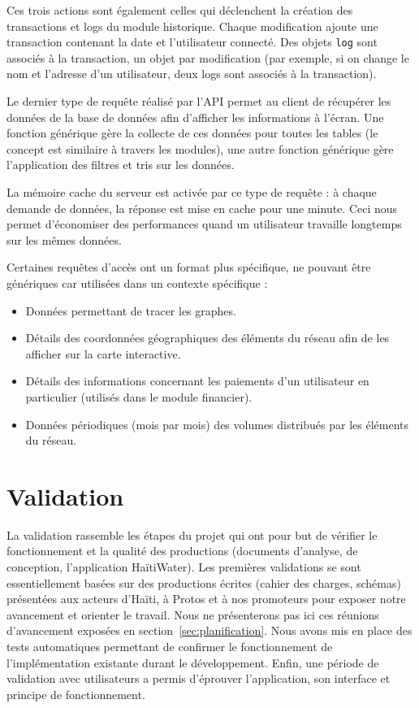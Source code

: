 \documentclass{EPL-master-thesis-covers-FR}
\begin{document}
				Ces trois actions sont également celles qui déclenchent la création des transactions et logs du module historique. Chaque modification ajoute une transaction contenant la date et l'utilisateur connecté. Des objets \texttt{log} sont associés à la transaction, un objet par modification (par exemple, si on change le nom et l'adresse d'un utilisateur, deux logs sont associés à la transaction).

				Le dernier type de requête réalisé par l'API permet au client de récupérer les données de la base de données afin d'afficher les informations à l'écran. Une fonction générique gère la collecte de ces données pour toutes les tables (le concept est similaire à travers les modules), une autre fonction générique gère l'application des filtres et tris sur les données.

				La mémoire cache du serveur est activée par ce type de requête : à chaque demande de données, la réponse est mise en cache pour une minute. Ceci nous permet d'économiser des performances quand un utilisateur travaille longtemps sur les mêmes données.

				Certaines requêtes d'accès ont un format plus spécifique, ne pouvant être génériques car utilisées dans un contexte spécifique :

				\begin{itemize}
					\item Données permettant de tracer les graphes.
					\item Détails des coordonnées géographiques des éléments du réseau afin de les afficher sur la carte interactive.
					\item Détails des informations concernant les paiements d'un utilisateur en particulier (utilisés dans le module financier).
					\item Données périodiques (mois par mois) des volumes distribués par les éléments du réseau.
				\end{itemize}

	\chapter{Validation}


		La validation rassemble les étapes du projet qui ont pour but de vérifier le fonctionnement et la qualité des productions (documents d'analyse, de conception, l'application HaïtiWater). Les premières validations se sont essentiellement basées sur des productions écrites (cahier des charges, schémas) présentées aux acteurs d'Haïti, à Protos et à nos promoteurs pour exposer notre avancement et orienter le travail. Nous ne présenterons pas ici ces réunions d'avancement exposées en section~\ref{sec:planification}. Nous avons mis en place des tests automatiques permettant de confirmer le fonctionnement de l'implémentation existante durant le développement. Enfin, une période de validation avec utilisateurs a permis d'éprouver l'application, son interface et principe de fonctionnement.
\end{document}
